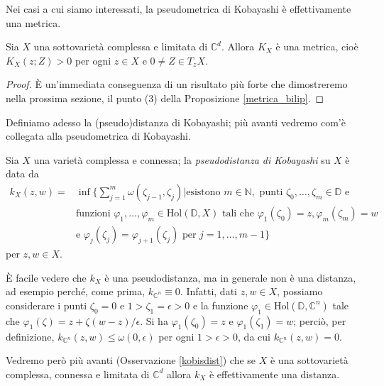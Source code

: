 Nei casi a cui siamo interessati, la pseudometrica di Kobayashi è effettivamente una metrica.

\begin{prop}
    Sia $X$ una sottovarietà complessa e limitata di $\mathbb{C}^d$. Allora $K_X$ è una metrica, cioè $K_X(z;Z)>0$ per ogni $z\in X$ e $0\not=Z\in T_zX$.
\end{prop}

\begin{proof}
    È un'immediata conseguenza di un risultato più forte che dimostreremo nella prossima sezione, il punto (3) della Proposizione \ref{metrica_bilip}.
\end{proof}

Definiamo adesso la (pseudo)distanza di Kobayashi; più avanti vedremo com'è collegata alla pseudometrica di Kobayashi.

\begin{defn}
    Sia $X$ una varietà complessa e connessa; la \textit{pseudodistanza di Kobayashi} su $X$ è data da
    \begin{equation}\begin{split}
        k_X(z,w)=&\inf\Bigg\{\sum_{j=1}^m \omega(\zeta_{j-1},\zeta_j) \bigg\vert \text{esistono }m\in\mathbb{N},\text{ punti }\zeta_0,\dots,\zeta_m \in \mathbb{D}\text{ e}\\
        &\text{funzioni }\varphi_1,\dots,\varphi_m\in\text{Hol}(\mathbb{D},X) \text{ tali che } \varphi_1(\zeta_0)=z,\varphi_m(\zeta_m)=w\\
        &\text{e }\varphi_j(\zeta_j)=\varphi_{j+1}(\zeta_j)\text{ per }j=1,\dots,m-1\Bigg\}
    \end{split}\end{equation}
    per $z,w \in X$.
\end{defn}

\begin{oss} \label{k_lip}
    È facile vedere che $k_X$ è una pseudodistanza, ma in generale non è una distanza, ad esempio perché, come prima, $k_{\mathbb{C}^n}\equiv 0$. Infatti, dati $z,w\in X$, possiamo considerare i punti $\zeta_0=0$ e $1>\zeta_1=\epsilon>0$ e la funzione $\varphi_1\in\text{Hol}(\mathbb{D},\mathbb{C}^n)$ tale che $\varphi_1(\zeta)=z+\zeta(w-z)/\epsilon$. Si ha $\varphi_1(\zeta_0)=z$ e $\varphi_1(\zeta_1)=w$; perciò, per definizione, $k_{\mathbb{C}^n}(z,w) \le \omega(0,\epsilon)$ per ogni $1>\epsilon>0$, da cui $k_{\mathbb{C}^n}(z,w)=0$.
    
    Vedremo però più avanti (Osservazione \ref{kobisdist}) che se $X$ è una sottovarietà complessa, connessa e limitata di $\mathbb{C}^d$ allora $k_X$ è effettivamente una distanza.
\end{oss}

